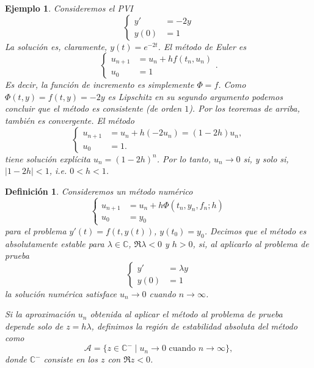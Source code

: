 \documentclass[11pt,letterpaper]{report}
\newtheorem{definition}{Definición}
\newtheorem{example}{Ejemplo}
\newcommand\C{\mathbb C}
\begin{document}
\begin{example}
  Consideremos el PVI
  \begin{equation}
    \left\{
    \begin{aligned}
      y' &= -2y \\
      y(0) &= 1
    \end{aligned}
    \right.
  \end{equation}
  La solución es, claramente, $y(t)=e^{-2t}$.
  El método de Euler es
  \begin{equation}
    \left\{
    \begin{aligned}
      u_{n+1} &= u_n + hf(t_n,u_n) \\
      u_0 &= 1
    \end{aligned}
    \right.
  .\end{equation}
  Es decir, la función de incremento es simplemente $\Phi=f$.
  Como $\Phi(t,y)=f(t,y)=-2y$ es Lipschitz en su segundo argumento
  podemos concluir que el método es consistente (de orden $1$).
  Por los teoremas de arriba, también es convergente.
  El método
  \begin{equation}
    \left\{
    \begin{aligned}
      u_{n+1} &= u_n + h(-2u_n) = (1-2h)u_n, \\
      u_0 &= 1.
    \end{aligned}
    \right.
  \end{equation}
  tiene solución explícita $u_n=(1-2h)^{n}$. Por lo tanto, $u_n\to 0$
  si, y solo si, $|1-2h|<1$, i.e. $0<h<1$.
\end{example}

\begin{definition}
  Consideremos un método numérico
  \begin{equation}
    \left\{
      \begin{aligned}
        u_{n+1} &= u_n + h\Phi(t_n,y_n,f_n;h)
        \\
        u_0 &= y_0
      \end{aligned}
    \right.
  \end{equation}
  para el problema $y'(t)=f(t,y(t))$, $y(t_0)=y_0$.
  Decimos que el método es absolutamente estable para $\lambda\in\C$,
  $\Re\lambda<0$ y $h>0$, si, al aplicarlo al problema de prueba
  \begin{equation}
    \left\{
      \begin{aligned}
        y' &= \lambda y
        \\
        y(0) &= 1
      \end{aligned}
    \right.
  \end{equation}
  la solución numérica satisface $u_n\to 0$ cuando $n\to\infty$.

  Si la aproximación $u_n$ obtenida al aplicar el método al problema
  de prueba depende solo de $z=h\lambda$, definimos la región de
  estabilidad absoluta del método como
  \begin{equation}
    \mathcal A
    =
    \{z \in \C^{-}\mid u_n\to 0 \text{ cuando } n\to \infty\}
  ,\end{equation}
  donde $\C^{-}$ consiste en los $z$ con $\Re z<0$.
\end{definition}
\end{document}
